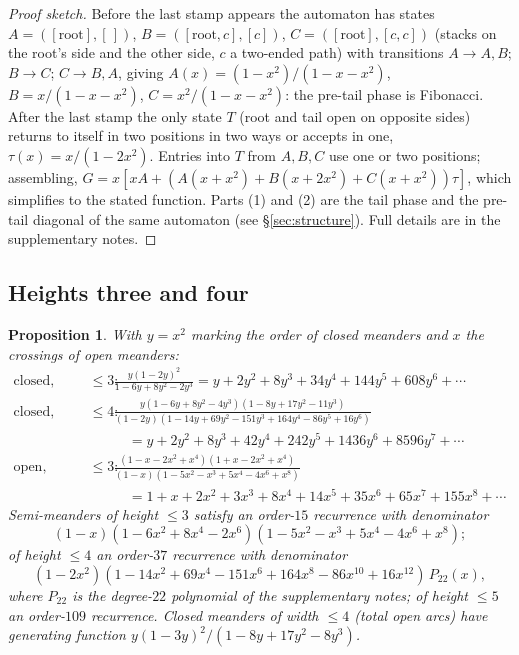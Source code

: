\documentclass[11pt]{amsart}
\newtheorem{proposition}[theorem]{Proposition}
\theoremstyle{definition}
\begin{document}
\begin{proof}[Proof sketch]
Before the last stamp appears the automaton has states $A=([\mathrm{root}],[\,])$, $B=([\mathrm{root},c],[c])$, $C=([\mathrm{root}],[c,c])$ (stacks on the root's side and the other side, $c$ a two-ended path) with transitions $A\to A,B$; $B\to C$; $C\to B,A$, giving $A(x)=(1-x^2)/(1-x-x^2)$, $B=x/(1-x-x^2)$, $C=x^2/(1-x-x^2)$: the pre-tail phase is Fibonacci. After the last stamp the only state $T$ (root and tail open on opposite sides) returns to itself in two positions in two ways or accepts in one, $\tau(x)=x/(1-2x^2)$. Entries into $T$ from $A,B,C$ use one or two positions; assembling, $G=x[xA+(A(x+x^2)+B(x+2x^2)+C(x+x^2))\tau]$, which simplifies to the stated function. Parts (1) and (2) are the tail phase and the pre-tail diagonal of the same automaton (see \S\ref{sec:structure}). Full details are in the supplementary notes.
\end{proof}

\subsection{Heights three and four}
\begin{proposition}\label{prop:h34}
With $y=x^2$ marking the order of closed meanders and $x$ the crossings of open meanders:
\begin{align*}
\text{closed, height}\le3:&\quad \frac{y(1-2y)^2}{1-6y+8y^2-2y^3}=y+2y^2+8y^3+34y^4+144y^5+608y^6+\cdots\\
\text{closed, height}\le4:&\quad \frac{y(1-6y+8y^2-4y^3)(1-8y+17y^2-11y^3)}{(1-2y)(1-14y+69y^2-151y^3+164y^4-86y^5+16y^6)}\\
&\qquad = y+2y^2+8y^3+42y^4+242y^5+1436y^6+8596y^7+\cdots\\
\text{open, height}\le3:&\quad\frac{(1-x-2x^2+x^4)(1+x-2x^2+x^4)}{(1-x)(1-5x^2-x^3+5x^4-4x^6+x^8)}\\
&\qquad =1+x+2x^2+3x^3+8x^4+14x^5+35x^6+65x^7+155x^8+\cdots
\end{align*}
Semi-meanders of height $\le3$ satisfy an order-$15$ recurrence with denominator
\[(1-x)(1-6x^2+8x^4-2x^6)(1-5x^2-x^3+5x^4-4x^6+x^8);\]
of height $\le4$ an order-$37$ recurrence with denominator
\[(1-2x^2)(1-14x^2+69x^4-151x^6+164x^8-86x^{10}+16x^{12})\,P_{22}(x),\]
where $P_{22}$ is the degree-$22$ polynomial of the supplementary notes; of height $\le5$ an order-$109$ recurrence. Closed meanders of width $\le4$ (total open arcs) have generating function $y(1-3y)^2/(1-8y+17y^2-8y^3)$.
\end{proposition}
\end{document}
